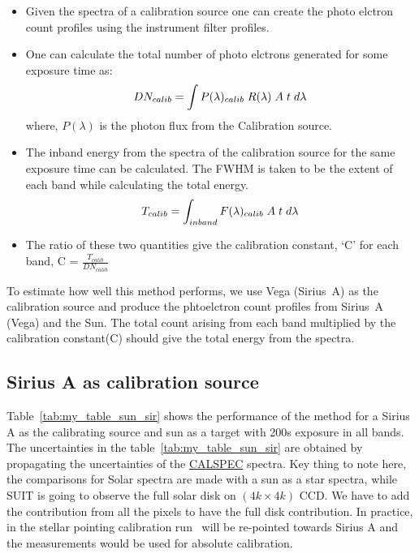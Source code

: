 \begin{itemize}
    \item Given the spectra of a calibration source one can create the photo elctron count profiles using the instrument filter profiles.
    
    \item One can calculate the total number of photo elctrons generated for some exposure time as:
    \begin{equation*}
        DN_{calib} = \int P(\lambda)_{calib\hspace{0.1cm}}R(\lambda)\hspace{0.1cm}A\hspace{0.1cm}t\hspace{0.1cm} d\lambda
    \end{equation*}
    \noindent where, $P(\lambda)$ is the photon flux from the Calibration source.
    
    \item The inband energy from the spectra of the calibration source for the same exposure time can be calculated. The FWHM is taken to be the extent of each band while calculating the total energy.
    \begin{equation*}
        T_{calib} = \int_{inband} F(\lambda)_{calib}\hspace{0.1cm} A\hspace{0.1cm}t\hspace{0.1cm} d\lambda
    \end{equation*}
    \item The ratio of these two quantities give the calibration constant, `C' for each band, C = $\frac{T_{calib}}{DN_{calib}}$
\end{itemize}

To estimate how well this method performs, we use Vega (Sirius~A) as the calibration source and produce the phtoelctron count profiles from Sirius~A (Vega) and the Sun. The total count arising from each band multiplied by the calibration constant(C) should give the total energy from the spectra.

\subsection{Sirius A as calibration source}\label{sirius}

Table~\ref{tab:my_table_sun_sir} shows the performance of the method for a Sirius A as the calibrating source and sun as a target with 200s exposure in all bands. The uncertainties in the table~\ref{tab:my_table_sun_sir} are obtained by propagating the uncertainties of the \href{https://www.stsci.edu/hst/instrumentation/reference-data-for-calibration-and-tools/astronomical-catalogs/calspec}{CALSPEC} spectra. Key thing to note here, the comparisons for Solar spectra are made with a sun as a star spectra, while SUIT is going to observe the full solar disk on $(4k \times 4k)$ CCD. We have to add the contribution from all the pixels to have the full disk contribution. In practice, in the stellar pointing calibration run \suit~will be re-pointed towards Sirius A and the measurements would be used for absolute calibration.


